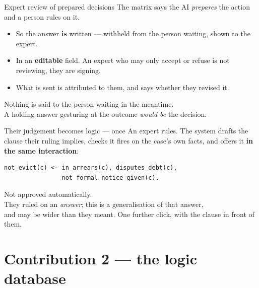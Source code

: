 \documentclass[aspectratio=169,11pt]{beamer}
\begin{document}
\begin{frame}{Expert review of prepared decisions}
  \vspace{1em}
  The matrix says the AI \emph{prepares} the action and a person rules on it.
  \vspace{.9em}
  \begin{itemize}\setlength\itemsep{.55em}
    \item So the answer \textbf{is} written --- withheld from the person
      waiting, shown to the expert.
    \item In an \textbf{editable} field. An expert who may only accept or
      refuse is not reviewing, they are signing.
    \item What is sent is attributed to them, and says whether they revised it.
  \end{itemize}
  \vspace{1.3em}
  \pause
  \begin{center}\color{muted}
    Nothing is said to the person waiting in the meantime.\\
    A holding answer gesturing at the outcome \emph{would be} the decision.
  \end{center}
\end{frame}

\begin{frame}[fragile]{Their judgement becomes logic --- once}
  \vspace{.7em}
  An expert rules. The system drafts the clause their ruling implies, checks it
  fires on the case's own facts, and offers it \textbf{in the same interaction}:
\begin{lstlisting}
not_evict(c) <- in_arrears(c), disputes_debt(c),
                not formal_notice_given(c).
\end{lstlisting}
  \vspace{.6em}
  \pause
  \begin{center}
    Not approved automatically.\\[.4em]
    {\color{muted}They ruled on an \emph{answer}; this is a generalisation of
    that answer,\\ and may be wider than they meant. One further click, with the
    clause in front of them.}
  \end{center}
\end{frame}

\section{Contribution 2 --- the logic database}
\end{document}
